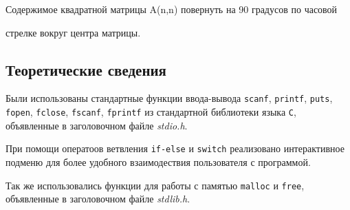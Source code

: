 \documentclass[12pt,a4paper]{report}
\begin{document}
\hspace{\parindent}Содержимое квадратной матрицы A(n,n) повернуть на 90 градусов по часовой

стрелке вокруг центра матрицы.
\subsection{Теоретические сведения}
\hspace{\parindent}\hspace{\parindent}Были использованы стандартные функции ввода-вывода \texttt{scanf}, \texttt{printf}, \texttt{puts}, \texttt{fopen}, \texttt{fclose}, \texttt{fscanf}, \texttt{fprintf} из стандартной библиотеки языка \verb+С+, объявленные в заголовочном файле \textit{stdio.h}.

При помощи оператоов ветвления \texttt{if-else} и \texttt{switch} реализовано интерактивное подменю для более удобного взаимодествия пользователя с программой.

Так же использовались функции для работы с памятью \verb+malloc+ и \verb+free+, объявленные в заголовочном файле \textit{stdlib.h}.
\end{document}
